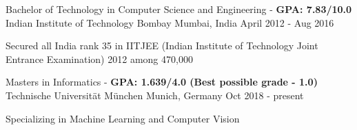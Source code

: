 
\begin{cventries}
  	
  	\cventry
    {Bachelor of Technology in Computer Science and Engineering - \textbf{GPA: 7.83/10.0}} %
    {Indian Institute of Technology Bombay} %
    {Mumbai, India} %
    {April 2012 - Aug 2016} %
    {
		\begin{cvitems}
			\item {Secured all India rank 35 in IITJEE (Indian Institute of Technology Joint Entrance Examination) 2012 among 470,000}
		\end{cvitems}
    }
	
	\cventry
	{Masters in Informatics - \textbf{GPA: 1.639/4.0 (Best possible grade - 1.0)}} %
	{Technische Universität München} %
	{Munich, Germany} %
	{Oct 2018 - present} %
	{
		\begin{cvitems}
			\item {Specializing in Machine Learning and Computer Vision}
		\end{cvitems}
	}

\end{cventries}
